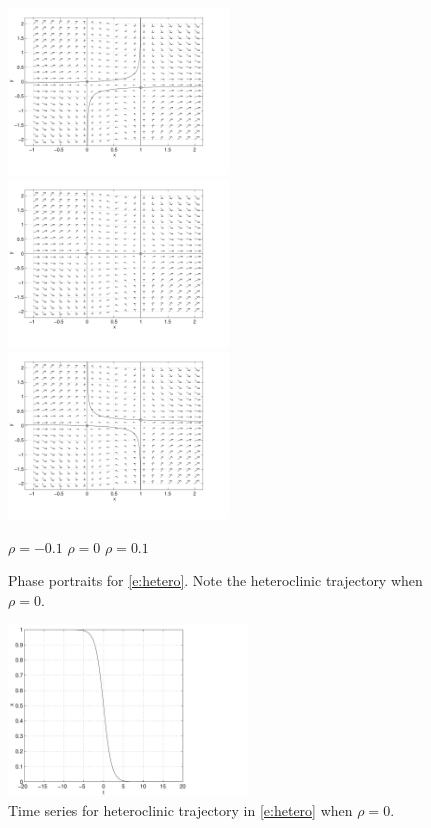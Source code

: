 \documentclass{ximera}
\begin{document}
\begin{figure}[htb]
           \centerline{%
	   \includegraphics[width=2.3in]{../figures/heteroa.pdf}
	   \includegraphics[width=2.3in]{../figures/heterob.pdf}
	   \includegraphics[width=2.3in]{../figures/heteroc.pdf}}
 	\vspace*{-0.2in}
	\hspace{0.3in} $\rho=-0.1$  \hspace{1.7in} $\rho=0$
		\hspace{1.8in} $\rho=0.1$ 
           \caption{Phase portraits for \protect\eqref{e:hetero}. 
	Note the heteroclinic trajectory when $\rho=0$.}
           \label{F:hetero}
\end{figure}

\begin{figure}[htb]
           \centerline{%
	   \includegraphics[width=2.5in]{../figures/heteroT.pdf}}
           \caption{Time series for heteroclinic trajectory 
		in \protect\eqref{e:hetero} when $\rho=0$.}
           \label{F:heteroT}
\end{figure}
\end{document}
